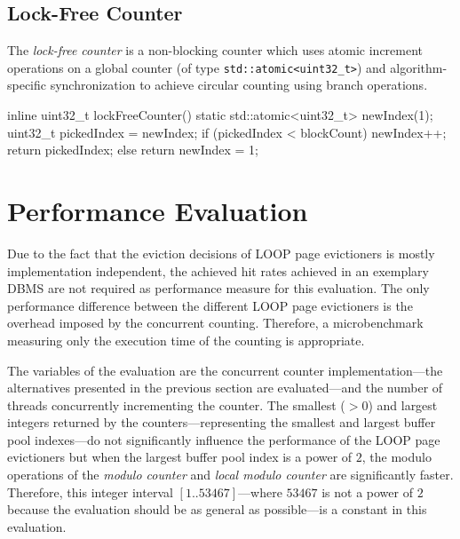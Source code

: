 \subsection[Lock-Free Counter]{Lock-Free Counter} \label{subsec:clunky_counter}

    The \emph{lock-free counter} is a non-blocking counter which uses atomic increment operations on a global counter (of type \lstinline{std::atomic<uint32_t>}) and algorithm-specific synchronization to achieve circular counting using branch operations.

\begin{@empty}
    \lstset{
        language = [ISO]C++
    }
\begin{centeredshadowboxlisting}
inline uint32_t lockFreeCounter() {
    static std::atomic<uint32_t> newIndex(1);
    uint32_t pickedIndex = newIndex;
    if (pickedIndex < blockCount) {
        newIndex++;
        return pickedIndex;
    } else {
        return newIndex = 1;
    }
}
\end{centeredshadowboxlisting}
\end{@empty}

\section[Performance Evaluation]{Performance Evaluation} \label{sec:loop-performance}

    Due to the fact that the eviction decisions of LOOP page evictioners is mostly implementation independent, the achieved hit rates achieved in an exemplary DBMS are not required as performance measure for this evaluation. The only performance difference between the different LOOP page evictioners is the overhead imposed by the concurrent counting. Therefore, a microbenchmark measuring only the execution time of the counting is appropriate.

    The variables of the evaluation are the concurrent counter implementation---the alternatives presented in the previous section are evaluated---and the number of threads concurrently incrementing the counter. The smallest ($>0$) and largest integers returned by the counters---representing the smallest and largest buffer pool indexes---do not significantly influence the performance of the LOOP page evictioners but when the largest buffer pool index is a power of $2$, the modulo operations of the \emph{modulo counter} and \emph{local modulo counter} are significantly faster. Therefore, this integer interval $\left[1 .. 53467\right]$---where $53467$ is not a power of $2$ because the evaluation should be as general as possible---is a constant in this evaluation.

